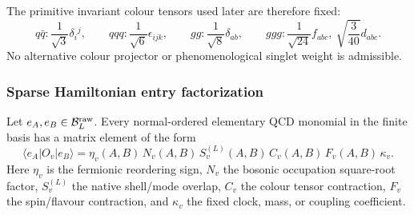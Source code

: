 \documentclass[12pt,a4paper]{article}
\begin{document}
The primitive invariant colour tensors used later are therefore fixed:
\[
q\bar q:\frac{1}{\sqrt3}\delta_i{}^j,
\qquad
qqq:\frac{1}{\sqrt6}\epsilon_{ijk},
\qquad
gg:\frac{1}{\sqrt8}\delta_{ab},
\qquad
ggg:\frac{1}{\sqrt{24}}f_{abc},\ \sqrt{\frac3{40}}d_{abc}.
\]
No alternative colour projector or phenomenological singlet weight is admissible.


\subsubsection{Sparse Hamiltonian entry factorization}
\label{p10:subsec:sparse-entry-factorization}

Let \(e_A,e_B\in\mathcal B_L^{\rm raw}\).  Every normal-ordered elementary QCD monomial in the finite basis has a matrix element of the form
\begin{equation}
\label{p10:eq:elementary-entry-factorization}
\langle e_A|O_v|e_B\rangle
=
\eta_v(A,B)\,N_v(A,B)\,S_v^{(L)}(A,B)\,C_v(A,B)\,F_v(A,B)\,\kappa_v .
\end{equation}
Here \(\eta_v\) is the fermionic reordering sign, \(N_v\) the bosonic occupation square-root factor, \(S_v^{(L)}\) the native shell/mode overlap, \(C_v\) the colour tensor contraction, \(F_v\) the spin/flavour contraction, and \(\kappa_v\) the fixed clock, mass, or coupling coefficient.
\end{document}
